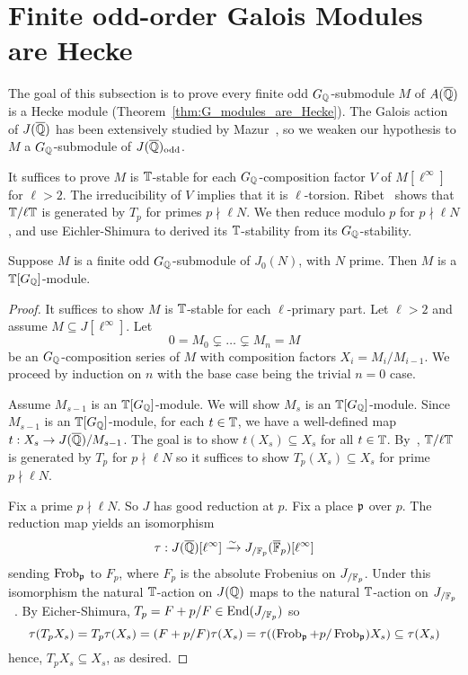 \documentclass[11pt, proquest]{uwthesis}
\begin{document}
\section{Finite odd-order Galois Modules are Hecke}%
\label{sec:finite_odd_order_galois_modules_are_hecke}

The goal of this subsection is to prove every finite odd $G_{\mathbb{Q}}$-submodule $M$
of $A(\overline{\mathbb{Q}})$ is a Hecke module (Theorem~\ref{thm:G_modules_are_Hecke}). The
Galois action of $J(\overline{\mathbb{Q}})$ has been extensively studied by
Mazur~\cite{mazur:eisenstein}, so we weaken our hypothesis to $M$ a
$G_{\mathbb{Q}}$-submodule of $J(\overline{\mathbb{Q}})_{\mathrm{odd}}$. 

It suffices to prove $M$ is $\mathbb{T}$-stable for each $G_{\mathbb{Q}}$-composition factor $V$
of $M[\ell^\infty]$ for $\ell>2$. The irreducibility of $V$ implies that it is
$\ell$-torsion. Ribet~\cite[Proposition 6.1]{ribet:semistable_gal} shows that
$\mathbb{T}/\ell \mathbb{T}$ is generated by $T_p$ for primes $p\nmid \ell N$. We then reduce
modulo $p$ for $p\nmid \ell N$, and use Eichler-Shimura to derived its
$\mathbb{T}$-stability from its $G_{\mathbb{Q}}$-stability.

\begin{theorem}\label{thm:G_modules_are_Hecke}
    Suppose $M$ is a finite odd $G_{\mathbb{Q}}$-submodule of $J_0(N)$, with $N$ prime.
    Then $M$ is a $\mathbb{T}[G_{\mathbb{Q}}]$-module.
\end{theorem}
\begin{proof}
    It suffices to show $M$ is $\mathbb{T}$-stable for each $\ell$-primary part. Let
    $\ell>2$ and assume $M\subseteq J[\ell^\infty]$. Let
    \[
        0 = M_0 \subsetneq \ldots \subsetneq M_n = M
    \]
    be an $G_{\mathbb{Q}}$-composition series of $M$ with composition factors $X_i =
    M_i/M_{i-1}$. We proceed by induction on $n$ with the base
    case being the trivial $n=0$ case. 
    
    Assume $M_{s-1}$ is an $\mathbb{T}[G_{\mathbb{Q}}]$-module. We will show $M_s$ is an
    $\mathbb{T}[G_{\mathbb{Q}}]$-module. Since $M_{s-1}$ is an $\mathbb{T}[G_{\mathbb{Q}}]$-module, for each
    $t\in \mathbb{T}$, we have a well-defined map $t:X_s\to J(\overline{\mathbb{Q}})/M_{s-1}$. The
    goal is to show $t(X_s)\subseteq X_s$ for all $t\in \mathbb{T}$.
    By~\cite[Proposition 2]{ribet:mult_p_finite}, $\mathbb{T}/\ell \mathbb{T}$ is generated
    by $T_p$ for $p\nmid \ell N$ so it suffices to show $T_p(X_s)\subseteq X_s$
    for prime $p\nmid \ell N$.

    Fix a prime $p\nmid \ell N$. So $J$ has good reduction at $p$. Fix a place
    $\mathfrak{p}$ over $p$. The reduction map
    yields an isomorphism~\cite[Theorem 1, Lemma 2]{serre-tate}
    \[
        \tau:J(\overline{\mathbb{Q}})[\ell^\infty] \xrightarrow{\sim} J_{/\mathbb{F}_p} (\overline{\mathbb{F}}_p)[\ell^\infty]
    \]
    sending $\operatorname{Frob}_{\mathfrak{p}}$ to $F_p$, where $F_p$ is the absolute Frobenius on
    $J_{/\mathbb{F}_p}$. Under this isomorphism the natural $\mathbb{T}$-action on $J(\mathbb{Q})$
    maps to the natural $\mathbb{T}$-action on $J_{/\mathbb{F}_p}$~\cite[\S
    5.2]{ribet-stein:serre}. By Eicher-Shimura, $T_p = F+p/F\in
    \operatorname{End}(J_{/\mathbb{F}_p})$ so
    \[
    \tau(T_p X_s) 
    = T_p\tau(X_s) 
    = (F+p/F)\tau(X_s)
    = \tau((\operatorname{Frob}_{\mathfrak{p}}+p/\operatorname{Frob}_{\mathfrak{p}})X_s)
    \subseteq \tau(X_s)
    \]
    hence, $T_p X_s\subseteq X_s$, as desired.
\end{proof}
\end{document}
